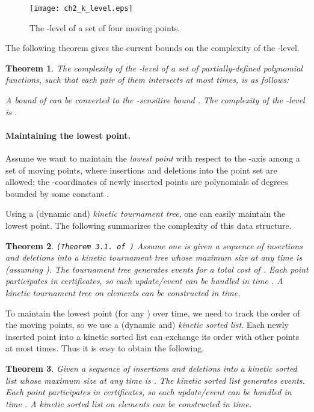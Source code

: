 \documentclass[preprint,12pt]{elsarticle}
\newtheorem{theorem}{Theorem}[section]
\begin{document}
\begin{figure}[h]
\centering
\texttt{[image: ch2\_k\_level.eps]}
\caption{The -level of a set of four moving points.}
\label{fig:k_level}
\end{figure}

The following theorem gives the current bounds on the complexity of the -level.

\begin{theorem}\label{the:k_levelComplexity}{\tt \cite{AACS1998,chanii2005,Chan:2008:LAC:1377676.1377691,SharirM1991}}
The complexity of the -level of a set of  partially-defined polynomial functions, such that each pair of them intersects at most  times, is as follows:

A bound  of  can be converted to the -sensitive bound . The complexity of the -level is . \end{theorem}
\paragraph{Maintaining the  lowest point.} Assume we want to maintain the \textit{ lowest point} with respect to the -axis among a set  of moving points, where insertions and deletions into the point set  are allowed; the -coordinates of newly inserted points are polynomials of degrees bounded by some constant . 

Using a (dynamic and) \textit{kinetic tournament tree}, one can easily maintain the lowest point. The following summarizes the complexity of this data structure.

\begin{theorem}\label{the:KineticTT} {\tt (Theorem 3.1. of \cite{Agarwal:2008:KDD:1435375.1435379})}
Assume one is given a sequence of  insertions and deletions into a kinetic tournament tree whose maximum size at any time is  (assuming ). The tournament tree generates  events for a total cost of . Each point participates in  certificates, so each update/event can be handled in time . A kinetic tournament tree on  elements can be constructed in  time.  
\end{theorem}

To maintain the  lowest point (for any ) over time, we need to track the order of the moving points, so we use a (dynamic and) \textit{kinetic sorted list}. Each newly inserted point into a kinetic sorted list can exchange its order with other points at most  times.  Thus it is easy to obtain the following.

\begin{theorem}\label{the:KineticSL}
Given a sequence of  insertions and deletions into a kinetic sorted list whose maximum size at any time is . The kinetic sorted list generates  events. Each point participates in  certificates, so each update/event can be handled in time . A kinetic sorted list on  elements can be constructed in  time.  
\end{theorem}
\end{document}
